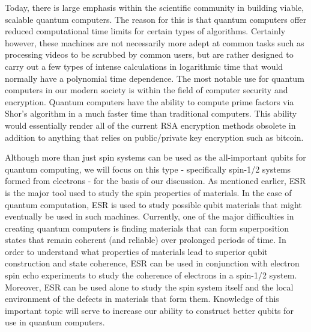 \documentclass[oneside, astronomy, noacknowlegments]{BYUPhys}
\begin{document}
Today, there is large emphasis within the scientific community in building viable, scalable quantum computers. The reason for this is that quantum computers offer reduced computational time limits for certain types of algorithms. Certainly however, these machines are not necessarily more adept at common tasks such as processing videos to be scrubbed by common users, but are rather designed to carry out a few types of intense calculations in logarithmic time that would normally have a polynomial time dependence. The most notable use for quantum computers in our modern society is within the field of computer security and encryption. Quantum computers have the ability to compute prime factors via Shor's algorithm in a much faster time than traditional computers. This ability would essentially render all of the current RSA encryption methods obsolete in addition to anything that relies on public/private key encryption such as bitcoin.

Although more than just spin systems can be used as the all-important qubits for quantum computing, we will focus on this type - specifically spin-1/2 systems formed from electrons - for the basis of our discussion. As mentioned earlier, ESR is the major tool used to study the spin properties of materials. In the case of quantum computation, ESR is used to study possible qubit materials that might eventually be used in such machines. Currently, one of the major difficulties in creating quantum computers is finding materials that can form superposition states that remain coherent (and reliable) over prolonged periods of time. In order to understand what properties of materials lead to superior qubit construction and state coherence, ESR can be used in conjunction with electron spin echo experiments to study the coherence of electrons in a spin-1/2 system. Moreover, ESR can be used alone to study the spin system itself and the local environment of the defects in materials that form them. Knowledge of this important topic will serve to increase our ability to construct better qubits for use in quantum computers.
\end{document}
